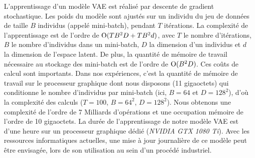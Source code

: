 L'apprentissage d'un modèle VAE est réalisé par descente de gradient stochastique.
Les poids du modèle sont ajustés sur un individu du jeu de données de taille $B$ individus (appelé mini-batch), pendant $T$ itérations.
La complexité de l'apprentissage est de l'ordre de $\operatorname{O}(T B^2 D + T B^2 d)$, avec $T$ le nombre d'itérations, $B$ le nombre d'individus dans un mini-batch, $D$ la dimension d'un individus et $d$ la dimension de l'espace latent.
De plus, la quantité de mémoire de travail nécessaire au stockage des mini-batch est de l'ordre de  $\operatorname{O}(B^2 D)$.
Ces coûts de calcul sont importants.
Dans nos expériences, c'est la quantité de mémoire de travail sur le processeur graphique dont nous disposons (11 gigaoctets) qui conditionne le nombre d'individus par mini-batch (ici, $B=64$ et $D=128^2$), d'où la complexité des calculs ($T=100$, $B=64^2$, $D=128^2$). Nous obtenons une complexité de l'ordre de 7 Milliards d'opérations et une occupation mémoire de l'ordre de 10 gigaoctets.
La durée de l'apprentissage de notre modèle VAE est d'une heure sur un processeur graphique dédié (\textit{NVIDIA GTX 1080 Ti}).
Avec les ressources informatiques actuelles, une mise à jour journalière de ce modèle peut être envisagée, lors de son utilisation au sein d'un procédé industriel.



